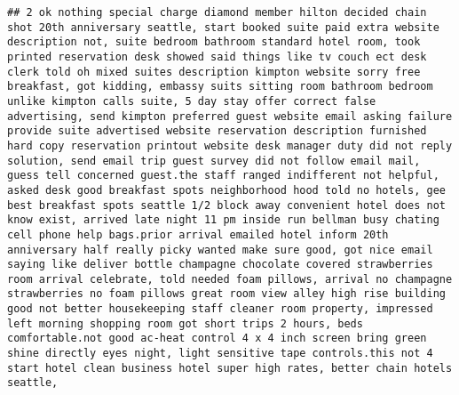 \documentclass[
]{article}
\begin{document}
\begin{verbatim}
## 2 ok nothing special charge diamond member hilton decided chain shot 20th anniversary seattle, start booked suite paid extra website description not, suite bedroom bathroom standard hotel room, took printed reservation desk showed said things like tv couch ect desk clerk told oh mixed suites description kimpton website sorry free breakfast, got kidding, embassy suits sitting room bathroom bedroom unlike kimpton calls suite, 5 day stay offer correct false advertising, send kimpton preferred guest website email asking failure provide suite advertised website reservation description furnished hard copy reservation printout website desk manager duty did not reply solution, send email trip guest survey did not follow email mail, guess tell concerned guest.the staff ranged indifferent not helpful, asked desk good breakfast spots neighborhood hood told no hotels, gee best breakfast spots seattle 1/2 block away convenient hotel does not know exist, arrived late night 11 pm inside run bellman busy chating cell phone help bags.prior arrival emailed hotel inform 20th anniversary half really picky wanted make sure good, got nice email saying like deliver bottle champagne chocolate covered strawberries room arrival celebrate, told needed foam pillows, arrival no champagne strawberries no foam pillows great room view alley high rise building good not better housekeeping staff cleaner room property, impressed left morning shopping room got short trips 2 hours, beds comfortable.not good ac-heat control 4 x 4 inch screen bring green shine directly eyes night, light sensitive tape controls.this not 4 start hotel clean business hotel super high rates, better chain hotels seattle,  

\end{verbatim}
\end{document}
